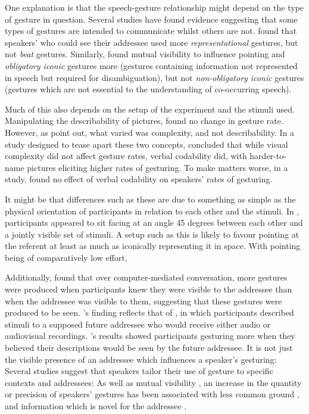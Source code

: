 \documentclass[a4paper,man,natbib]{apa6}
\newcommand*{\term}[1]{\emph{#1}} %
\begin{document}
One explanation is that the speech-gesture relationship might depend on the type of gesture in question.
Several studies have found evidence suggesting that some types of gestures are intended to communicate whilst others are not.
\citet{Alibali2001} found that speakers' who could see their addressee used more \term{representational} gestures, but not \term{beat} gestures. 
Similarly, \citet{DeRuiter2012} found mutual visibility to influence pointing and \term{obligatory iconic} gestures more (gestures containing information not represented in speech but required for disambiguation), but not \term{non-obligatory iconic} gestures (gestures which are not essential to the understanding of co-occurring speech).

Much of this also depends on the setup of the experiment and the stimuli used. 
Manipulating the describability of pictures, \citet{DeRuiter1998} found no change in gesture rate.
However, as \citet{Morsella2004} point out, what \citeauthor{DeRuiter1998} varied was complexity, and not describability. 
In a study designed to tease apart these two concepts, \citet{Morsella2004} concluded that while visual complexity did not affect gesture rates, verbal codability did, with harder-to-name pictures eliciting higher rates of gesturing.
To make matters worse, in a \citeyear{DeRuiter2012} study, \citeauthor{DeRuiter2012} found no effect of verbal codability on speakers' rates of gesturing. 

It might be that differences such as these are due to something as simple as the physical orientation of participants in relation to each other and the stimuli. 
In \citet{DeRuiter2012}, participants appeared to sit facing at an angle 45 degrees between each other and a jointly visible set of stimuli. 
A setup such as this is likely to favour pointing at the referent at least as much as iconically representing it in space.
With pointing being of comparatively low effort, 









Additionally, \citet{Mol2011} found that over computer-mediated conversation, more gestures were produced when participants knew they were visible to the addressee than when the addressee was visible to them, suggesting that these gestures were produced to be seen. 
\citeauthor{Mol2011}'s finding reflects that of \citet{Bavelas2002}, in which participants described stimuli to a supposed future addressee who would receive either audio or audiovisual recordings. \citeauthor{Bavelas2002}'s results showed participants gesturing more when they believed their descriptions would be seen by the future addressee.
It is not just the visible presence of an addressee which influences a speaker's gesturing: Several studies suggest that speakers tailor their use of gesture to specific contexts and addressees:
As well as mutual visibility \citep{Alibali2001, Cohen1973, Hoetjes2015}, an increase in the quantity or precision of speakers' gestures has been associated with less common ground \citep{Gerwing2004, Holler2007}, and information which is novel for the addressee \citep{Jacobs2007}.\\
\end{document}
